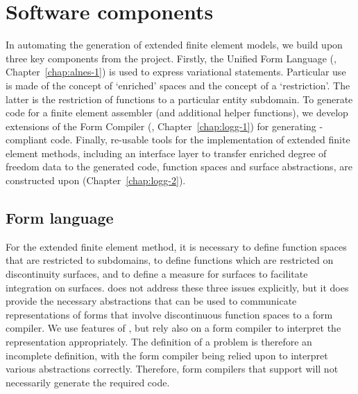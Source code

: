 \section{Software components}

In automating the generation of extended finite element models, we
build upon three key components from the \fenics{} project. Firstly,
the Unified Form Language (\ufl{}, Chapter~\ref{chap:alnes-1}) is used to
express variational statements. Particular use is made of the concept of
`enriched' spaces and the \ufl{} concept of a `restriction'. The latter
is the restriction of functions to a particular entity subdomain.
To generate code for a finite element assembler (and additional helper
functions), we develop extensions of the \fenics{} Form Compiler (\ffc{},
Chapter~\ref{chap:logg-1}) for generating \ufc{}-compliant code. Finally,
re-usable tools for the implementation of extended finite element methods,
including an interface layer to transfer enriched degree of freedom
data to the generated code, function spaces and surface abstractions,
are constructed upon \dolfin{} (Chapter~\ref{chap:logg-2}).
\subsection{Form language}

For the extended finite element method, it is necessary to define
function spaces that are restricted to subdomains, to define
functions which are restricted on discontinuity surfaces, and to define a
measure for surfaces to facilitate integration on surfaces.  \ufl{}
does not address these three issues explicitly, but it does provide the
necessary abstractions that can be used to communicate representations of
forms that involve discontinuous function spaces to a form compiler. We
use features of \ufl{}, but rely also on a form compiler to interpret
the \ufl{} representation appropriately.  The \ufl{} definition of a
problem is therefore an incomplete definition, with the form compiler
being relied upon to interpret various abstractions correctly. Therefore,
form compilers that support \ufl{} will not necessarily generate the
required code.

